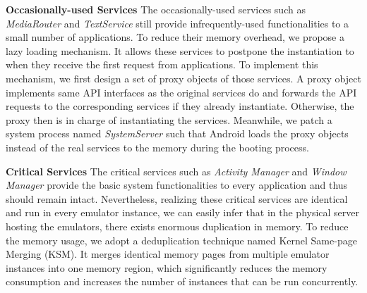 \documentclass[conference]{IEEEtranl}
\begin{document}
	\textbf{Occasionally-used Services}
	The occasionally-used services such as \textit{MediaRouter} and \textit{TextService} still provide  infrequently-used functionalities to a small number of applications. To reduce their memory overhead, we propose a lazy loading mechanism. It allows these services to postpone the instantiation to when they receive the first request from applications. To implement this mechanism, we first design a set of proxy objects of those services. A proxy object implements same API interfaces as the original services do and forwards the API requests to the corresponding services if they already instantiate. Otherwise, the proxy then is in charge of instantiating the services. Meanwhile, we patch a system process named \textit{SystemServer} such that Android loads the proxy objects instead of the real services to the memory during the booting process. 


	\textbf{Critical Services}
	The critical services such as \textit{Activity Manager} and \textit{Window Manager} provide the basic system functionalities to every application and thus should remain intact. Nevertheless, realizing these critical services are identical and run in every emulator instance, we can easily infer that in the physical server hosting the emulators, there exists enormous duplication in memory. To reduce the memory usage, we adopt a deduplication technique named Kernel Same-page Merging (KSM). It merges identical memory pages from multiple emulator instances into one memory region, which significantly reduces the memory consumption and increases the number of instances that can be run concurrently.




\end{document}
